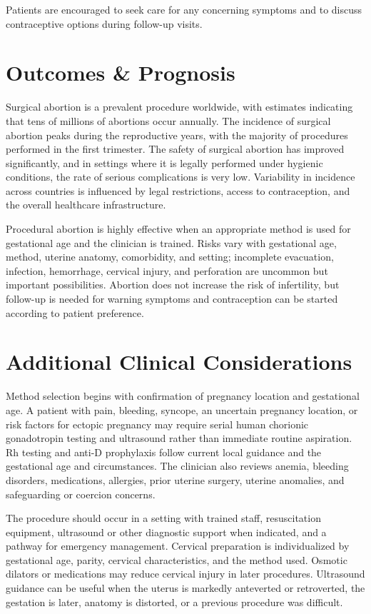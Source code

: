 Patients are encouraged to seek care for any concerning symptoms and to discuss contraceptive options during follow-up visits.

\section*{Outcomes \& Prognosis}
Surgical abortion is a prevalent procedure worldwide, with estimates indicating that tens of millions of abortions occur annually. The incidence of surgical abortion peaks during the reproductive years, with the majority of procedures performed in the first trimester. The safety of surgical abortion has improved significantly, and in settings where it is legally performed under hygienic conditions, the rate of serious complications is very low. Variability in incidence across countries is influenced by legal restrictions, access to contraception, and the overall healthcare infrastructure.

Procedural abortion is highly effective when an appropriate method is used for gestational age and the clinician is trained. Risks vary with gestational age, method, uterine anatomy, comorbidity, and setting; incomplete evacuation, infection, hemorrhage, cervical injury, and perforation are uncommon but important possibilities. Abortion does not increase the risk of infertility, but follow-up is needed for warning symptoms and contraception can be started according to patient preference.

\section*{Additional Clinical Considerations}
Method selection begins with confirmation of pregnancy location and gestational age. A patient with pain, bleeding, syncope, an uncertain pregnancy location, or risk factors for ectopic pregnancy may require serial human chorionic gonadotropin testing and ultrasound rather than immediate routine aspiration. Rh testing and anti-D prophylaxis follow current local guidance and the gestational age and circumstances. The clinician also reviews anemia, bleeding disorders, medications, allergies, prior uterine surgery, uterine anomalies, and safeguarding or coercion concerns.

The procedure should occur in a setting with trained staff, resuscitation equipment, ultrasound or other diagnostic support when indicated, and a pathway for emergency management. Cervical preparation is individualized by gestational age, parity, cervical characteristics, and the method used. Osmotic dilators or medications may reduce cervical injury in later procedures. Ultrasound guidance can be useful when the uterus is markedly anteverted or retroverted, the gestation is later, anatomy is distorted, or a previous procedure was difficult.

